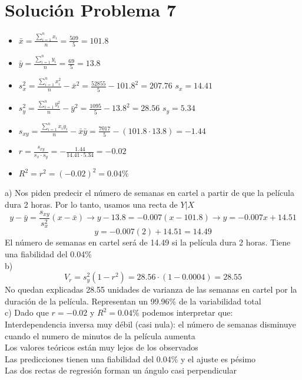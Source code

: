 \documentclass[fleqn]{article}
\begin{document}
	\section{Solución Problema 7}
	\begin{itemize}
		\item $\bar{x} = \frac{\sum_{i=1}^n x_i}{n} = \frac{509}{5} = 101.8$
		\item $\bar{y} = \frac{\sum_{i=1}^n y_i}{n} = \frac{69}{5} = 13.8$ 
		\item $s_x^{2} = \frac{\sum_{i=1}^n x_i^{2}}{n} - \bar{x}^{2} = \frac{52855}{5} - 101.8^{2} = 207.76$ $s_x = 14.41$
		\item $s_y^{2} = \frac{\sum_{i=1}^n y_i^{2}}{n} - \bar{y}^{2} = \frac{1095}{5} - 13.8^{2} = 28.56$ $s_y = 5.34$
		\item $s_{xy} = \frac{\sum_{i=1}^n x_i y_i}{n} - \bar{x} \bar{y} = \frac{7017}{5} - (101.8 \cdot 13.8) = -1.44$
		\item $r = \frac{s_{xy}}{s_x \cdot s_y} = -\frac{1.44}{14.41 \cdot 5.34} = -0.02$
		\item $R^2 = r^2 = (-0.02)^{2} = 0.04\%$
	\end{itemize}
	a) Nos piden predecir el número de semanas en cartel a partir de que la película dura 2 horas. Por lo tanto, usamos una recta de $Y | X$
	\[
	y - \bar{y} = \frac{s_{xy}}{s_x^{2}} (x - \bar{x}) \rightarrow y - 13.8 = -0.007(x - 101.8) \rightarrow y = -0.007x + 14.51
	\]
	\[
	y = -0.007(2) + 14.51 = 14.49
	\]
	El número de semanas en cartel será de 14.49 si la película dura 2 horas. Tiene una fiabilidad del 0.04\% \\
	b) 	\[
	V_r = s_y^2 (1-r^2) = 28.56 \cdot (1-0.0004) = \boxed{28.55} 
	\]
	No quedan explicadas 28.55 unidades de varianza de las semanas en cartel por la duración de la película. Representan un 99.96\% de la variabilidad total \\
	c) Dado que $r = -0.02$ y $R^2 = 0.04\%$ podemos interpretar que: \\
	Interdependencia inversa muy débil (casi nula): el número de semanas disminuye cuando el numero de minutos de la película aumenta \\
	Los valores teóricos están muy lejos de los observados \\
	Las predicciones tienen una fiabilidad del 0.04\% y el ajuste es pésimo \\
	Las dos rectas de regresión forman un ángulo casi perpendicular \\
\end{document}
